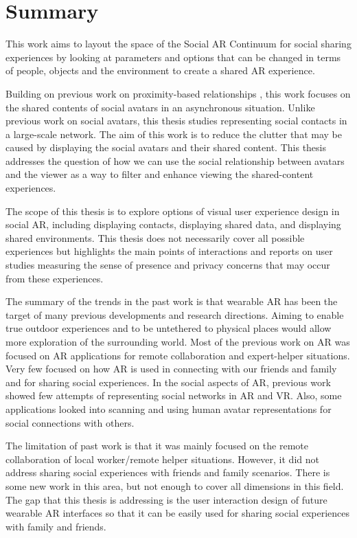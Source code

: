 \section{Summary}

This work aims to layout the space of the Social AR Continuum for social sharing experiences by looking at parameters and options that can be changed in terms of people, objects and the environment to create a shared AR experience. 

Building on previous work on proximity-based relationships \cite{Sousa2016}, this work focuses on the shared contents of social avatars in an asynchronous situation. Unlike previous work on social avatars, this thesis studies representing social contacts in a large-scale network. The aim of this work is to reduce the clutter that may be caused by displaying the social avatars and their shared content. This thesis addresses the question of how we can use the social relationship between avatars and the viewer as a way to filter and enhance viewing the shared-content experiences. 

The scope of this thesis is to explore options of visual user experience design in social AR, including displaying contacts, displaying shared data, and displaying shared environments. This thesis does not necessarily cover all possible experiences but highlights the main points of interactions and reports on user studies measuring the sense of presence and privacy concerns that may occur from these experiences. 

The summary of the trends in the past work is that
wearable AR has been the target of many previous developments and research directions. Aiming to enable true outdoor experiences and to be untethered to physical places would allow more exploration of the surrounding world. 
Most of the previous work on AR was focused on AR applications for remote collaboration and expert-helper situations. Very few focused on how AR is used in connecting with our friends and family and for sharing social experiences.
In the social aspects of AR, previous work showed few attempts of representing social networks in AR and VR. Also, some applications looked into scanning and using human avatar representations for social connections with others.

The limitation of past work is that it was mainly focused on the remote collaboration of local worker/remote helper situations. However, it did not address sharing social experiences with friends and family scenarios. There is some new work in this area, but not enough to cover all dimensions in this field. The gap that this thesis is addressing is the user interaction design of future wearable AR interfaces so that it can be easily used for sharing social experiences with family and friends. 

